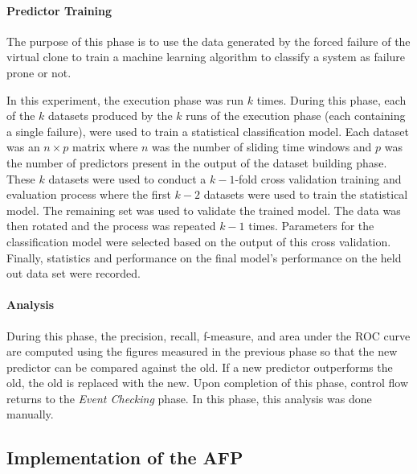 \tabMessageIDs %
\tabSlidingWindow

\paragraph{Predictor Training} \label{sec:predictor.training}
The purpose of this phase is to use the data generated by the forced failure of
the virtual clone to train a machine learning algorithm to classify a system as
failure prone or not.  

In this experiment, the execution phase was run $k$ times.  During this phase,
each of the $k$ datasets produced by the $k$ runs of the execution phase (each
containing a single failure), were used to train a statistical classification
model.  Each dataset was an $n \times p$ matrix where $n$ was the number of
sliding time windows and $p$ was the number of predictors present in the output
of the dataset building phase.  These $k$ datasets were used to conduct a $k -
1$-fold cross validation training and evaluation process where the first $k -
2$ datasets were used to train the statistical model.  The remaining set was
used to validate the trained model.  The data was then rotated and the process
was repeated $k - 1$ times.  Parameters for the classification model were
selected based on the output of this cross validation.  Finally, statistics and
performance on the final model's performance on the held out data set were
recorded.

\paragraph{Analysis}
During this phase, the precision, recall, f-measure, and area under the
\ac{ROC} curve are computed using the figures measured in the previous phase so
that the new predictor can be compared against the old.  If a new predictor
outperforms the old, the old is replaced with the new.  Upon completion of this
phase, control flow returns to the \emph{Event Checking} phase.  In this phase,
this analysis was done manually.

\subsection{Implementation of the \ac{AFP}} \label{sec:implementation}
